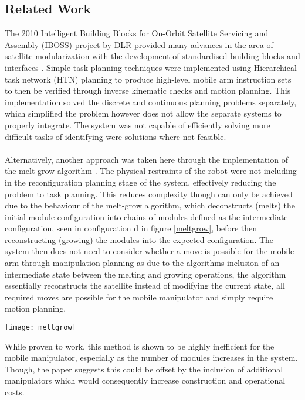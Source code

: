 \subsection{Related Work}
The 2010 Intelligent Building Blocks for On-Orbit Satellite Servicing and Assembly (IBOSS) project \cite{iBOSS} by DLR provided many advances in the area of satellite modularization with the development of standardised building blocks and interfaces \cite{iBossPaper}. Simple task planning techniques were implemented using Hierarchical task network (HTN) planning to produce high-level mobile arm instruction sets to then be verified through inverse kinematic checks and motion planning. This implementation solved the discrete and continuous planning problems separately, which simplified the problem however does not allow the separate systems to properly integrate. The system was not capable of efficiently solving more difficult tasks of identifying were solutions where not feasible.
\\\\
Alternatively, another approach was taken here \cite{8581406} through the implementation of the melt-grow algorithm \cite{773975}. The physical restraints of the robot were not including in the reconfiguration planning stage of the system, effectively reducing the problem to task planning. This reduces complexity though can only be achieved due to the behaviour of the melt-grow algorithm, which deconstructs (melts) the initial module configuration into chains of modules defined as the intermediate configuration, seen in configuration d in figure \ref{meltgrow}, before then reconstructing (growing) the modules into the expected configuration. The system then does not need to consider whether a move is possible for the mobile arm through manipulation planning as due to the algorithms inclusion of an intermediate state between the melting and growing operations, the algorithm essentially reconstructs the satellite instead of modifying the current state, all required moves are possible for the mobile manipulator and simply require motion planning.
\newpage
\begin{figure*}[!t]
	\centering
	\texttt{[image: meltgrow]}
	\caption{Melt-Grow algorithm simulation results. Image from \cite{8581406}}
	\label{meltgrow}
\end{figure*}
While proven to work, this method is shown to be highly inefficient for the mobile manipulator, especially as the number of modules increases in the system. Though, the paper \cite{8581406} suggests this could be offset by the inclusion of additional manipulators which would consequently increase construction and operational costs.
